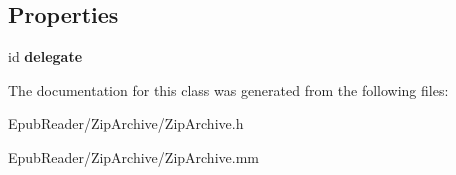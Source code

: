 \subsection*{Properties}
\begin{DoxyCompactItemize}
\item 
\hypertarget{interface_zip_archive_a072993638f1440f3781868317f8cb97c}{id {\bfseries delegate}}\label{interface_zip_archive_a072993638f1440f3781868317f8cb97c}

\end{DoxyCompactItemize}


The documentation for this class was generated from the following files\-:\begin{DoxyCompactItemize}
\item 
Epub\-Reader/\-Zip\-Archive/Zip\-Archive.\-h\item 
Epub\-Reader/\-Zip\-Archive/Zip\-Archive.\-mm\end{DoxyCompactItemize}
